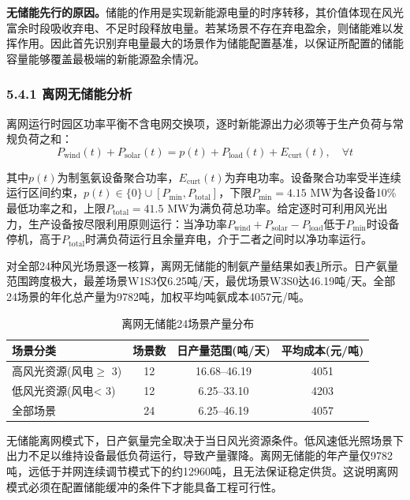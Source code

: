 \documentclass[zihao=-4,a4paper]{ctexart} %
\begin{document}
	\textbf{无储能先行的原因。}储能的作用是实现新能源电量的时序转移，其价值体现在风光富余时段吸收弃电、不足时段释放电量。若某场景不存在弃电盈余，则储能难以发挥作用。因此首先识别弃电量最大的场景作为储能配置基准，以保证所配置的储能容量能够覆盖最极端的新能源盈余情况。
	
	\subsubsection*{5.4.1 离网无储能分析}
	
	
	离网运行时园区功率平衡不含电网交换项，逐时新能源出力必须等于生产负荷与常规负荷之和：
	\begin{equation}
		P_{\text{wind}}(t) + P_{\text{solar}}(t) = p(t) + P_{\text{load}}(t) + E_{\text{curt}}(t), \quad \forall t
		\label{eq:q4_balance_ns}
	\end{equation}
	
	其中$p(t)$为制氢氨设备聚合功率，$E_{\text{curt}}(t)$为弃电功率。设备聚合功率受半连续运行区间约束，$p(t) \in \{0\} \cup [P_{\min}, P_{\text{total}}]$，下限$P_{\min}=4.15$ MW为各设备10\%最低功率之和，上限$P_{\text{total}}=41.5$ MW为满负荷总功率。给定逐时可利用风光出力，生产设备按尽限利用原则运行：当净功率$P_{\text{wind}}+P_{\text{solar}}-P_{\text{load}}$低于$P_{\min}$时设备停机，高于$P_{\text{total}}$时满负荷运行且余量弃电，介于二者之间时以净功率运行。
	
	对全部24种风光场景逐一核算，离网无储能的制氨产量结果如表\ref{tab:q4_nostorage}所示。日产氨量范围跨度极大，最差场景W1S3仅6.25吨/天，最优场景W3S0达46.19吨/天。全部24场景的年化总产量为9782吨，加权平均吨氨成本4057元/吨。
	
	\begin{table}[ht]
		\centering
		\small
		\caption{离网无储能24场景产量分布}
		\label{tab:q4_nostorage}
		\begin{tabular}{lccc}
			\toprule
			场景分类 & 场景数 & 日产量范围(吨/天) & 平均成本(元/吨) \\
			\midrule
			高风光资源(风电$\ge$ 3) & 12 & 16.68--46.19 & 4051 \\
			低风光资源(风电< 3) & 12 & 6.25--33.10 & 4203 \\
			全部场景 & 24 & 6.25--46.19 & 4057 \\
			\bottomrule
		\end{tabular}
	\end{table}
	
	无储能离网模式下，日产氨量完全取决于当日风光资源条件。低风速低光照场景下出力不足以维持设备最低负荷运行，导致产量骤降。离网无储能的年产量仅9782吨，远低于并网连续调节模式下的约12960吨，且无法保证稳定供货。这说明离网模式必须在配置储能缓冲的条件下才能具备工程可行性。
	
\end{document}
